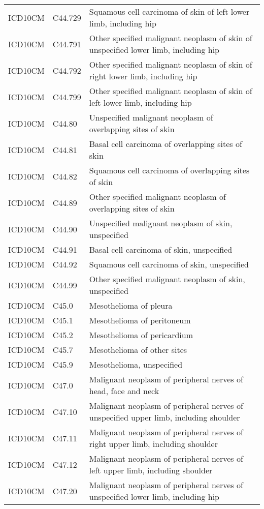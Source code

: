 \begin{longtable}{p{}p{}p{}}
  ICD10CM & C44.729 & Squamous cell carcinoma of skin of left lower limb, including hip \\ 
  ICD10CM & C44.791 & Other specified malignant neoplasm of skin of unspecified lower limb, including hip \\ 
  ICD10CM & C44.792 & Other specified malignant neoplasm of skin of right lower limb, including hip \\ 
  ICD10CM & C44.799 & Other specified malignant neoplasm of skin of left lower limb, including hip \\ 
  ICD10CM & C44.80 & Unspecified malignant neoplasm of overlapping sites of skin \\ 
  ICD10CM & C44.81 & Basal cell carcinoma of overlapping sites of skin \\ 
  ICD10CM & C44.82 & Squamous cell carcinoma of overlapping sites of skin \\ 
  ICD10CM & C44.89 & Other specified malignant neoplasm of overlapping sites of skin \\ 
  ICD10CM & C44.90 & Unspecified malignant neoplasm of skin, unspecified \\ 
  ICD10CM & C44.91 & Basal cell carcinoma of skin, unspecified \\ 
  ICD10CM & C44.92 & Squamous cell carcinoma of skin, unspecified \\ 
  ICD10CM & C44.99 & Other specified malignant neoplasm of skin, unspecified \\ 
  ICD10CM & C45.0 & Mesothelioma of pleura \\ 
  ICD10CM & C45.1 & Mesothelioma of peritoneum \\ 
  ICD10CM & C45.2 & Mesothelioma of pericardium \\ 
  ICD10CM & C45.7 & Mesothelioma of other sites \\ 
  ICD10CM & C45.9 & Mesothelioma, unspecified \\ 
  ICD10CM & C47.0 & Malignant neoplasm of peripheral nerves of head, face and neck \\ 
  ICD10CM & C47.10 & Malignant neoplasm of peripheral nerves of unspecified upper limb, including shoulder \\ 
  ICD10CM & C47.11 & Malignant neoplasm of peripheral nerves of right upper limb, including shoulder \\ 
  ICD10CM & C47.12 & Malignant neoplasm of peripheral nerves of left upper limb, including shoulder \\ 
  ICD10CM & C47.20 & Malignant neoplasm of peripheral nerves of unspecified lower limb, including hip \\ 

\end{longtable}
